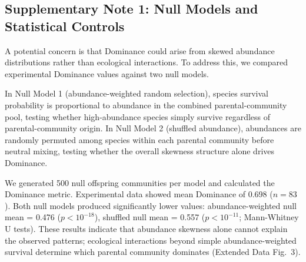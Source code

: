 
\subsection*{Supplementary Note 1: Null Models and Statistical Controls}
\label{sec:suppl:note1}

A potential concern is that Dominance could arise from skewed abundance distributions rather than ecological interactions. To address this, we compared experimental Dominance values against two null models.

In Null Model 1 (abundance-weighted random selection), species survival probability is proportional to abundance in the combined parental-community pool, testing whether high-abundance species simply survive regardless of parental-community origin. In Null Model 2 (shuffled abundance), abundances are randomly permuted among species within each parental community before neutral mixing, testing whether the overall skewness structure alone drives Dominance.

We generated 500 null offspring communities per model and calculated the Dominance metric. Experimental data showed mean Dominance of 0.698 ($n = 83$). Both null models produced significantly lower values: abundance-weighted null mean = 0.476 ($p < 10^{-18}$), shuffled null mean = 0.557 ($p < 10^{-11}$; Mann-Whitney U tests). These results indicate that abundance skewness alone cannot explain the observed patterns; ecological interactions beyond simple abundance-weighted survival determine which parental community dominates (Extended Data Fig.~3).

\paragraph{}
